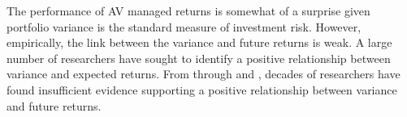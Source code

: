 The performance of AV managed returns is somewhat of a surprise given 
portfolio variance is the standard measure of investment risk. However, empirically, the link between the variance and future returns is weak. A large number of researchers have sought to identify a positive relationship between variance and expected returns. From \citet{haugen_1972} through \citet{FRENCH19873} and \citet{ang_cross-section_2006}, decades of researchers have found insufficient evidence supporting a positive relationship between variance and future returns. %
